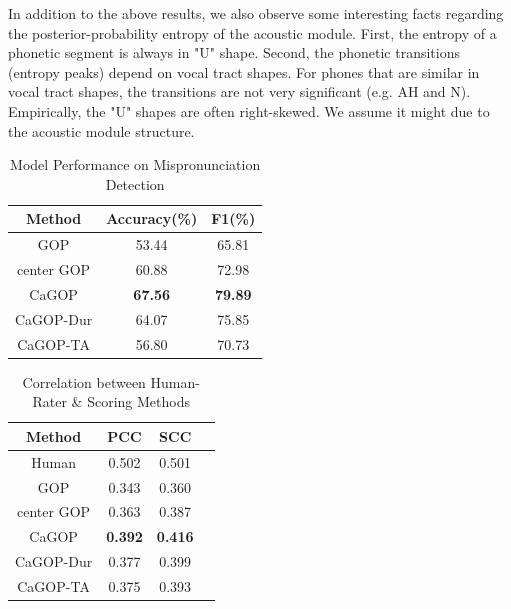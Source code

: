 \documentclass[a4paper]{article}
\begin{document}
In addition to the above results, we also observe some interesting facts regarding the posterior-probability entropy of the acoustic module. First, the entropy of a phonetic segment is always in "U" shape. Second, the phonetic transitions (entropy peaks) depend on vocal tract shapes. For phones that are similar in vocal tract shapes, the transitions are not very significant (e.g. AH and N). Empirically, the "U" shapes are often right-skewed. We assume it might due to the acoustic module structure.

\vspace{-4pt}
\begin{table}[th]
  \caption{Model Performance on Mispronunciation Detection}
  \label{tab:mispron-acc}
  \vspace{-4pt}
  \centering
  \begin{tabular}{ c  c  c}
    \toprule
    \textbf{Method} & \textbf{Accuracy(\%)} & \textbf{F1(\%)}\\
    \midrule
     GOP \cite{witt1999use} & 53.44 & 65.81  \\
     \hline
     center GOP  & 60.88 & 72.98  \\
     \hline
     CaGOP  & \textbf{67.56}  & \textbf{79.89}   \\
      \hline
     CaGOP-Dur  &   64.07 & 75.85    \\
     \hline
     CaGOP-TA & 56.80 & 70.73 \\
    \bottomrule
  \end{tabular}
\end{table}
\vspace{-10pt}

\begin{table}[th]
  \caption{Correlation between Human-Rater \& Scoring Methods}
  \label{tab:correlation}
  \vspace{-4pt}
  \centering
  \begin{tabular}{ c  c  c  c}
    \toprule
    \textbf{Method} & \textbf{PCC} & \textbf{SCC}\\
    \midrule
     Human & 0.502 & 0.501 \\
     \hline
     GOP \cite{witt1999use} & 0.343 & 0.360 \\
     \hline
     center GOP  &   0.363 & 0.387   \\
      \hline
     CaGOP  &   \textbf{0.392} & \textbf{0.416}   \\
     \hline
     CaGOP-Dur  &   0.377 & 0.399    \\
     \hline
     CaGOP-TA & 0.375 & 0.393 \\
    \bottomrule
  \end{tabular}
\end{table}
\vspace{-10pt}
\end{document}
